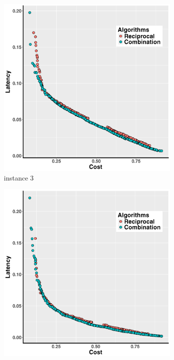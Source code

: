 \documentclass[10pt,journal,compsoc]{IEEEtran}
\begin{document}
\begin{figure}[h!]
\begin{subfigure}{0.49\linewidth}
       \includegraphics[width=\textwidth]{pics/combination_problem3.png}
    \caption{instance 3}
   \end{subfigure}
   \begin{subfigure}{0.49\linewidth}
       \includegraphics[width=\textwidth]{pics/combination_problem4.png}

\end{subfigure}
\end{figure}
\end{document}
